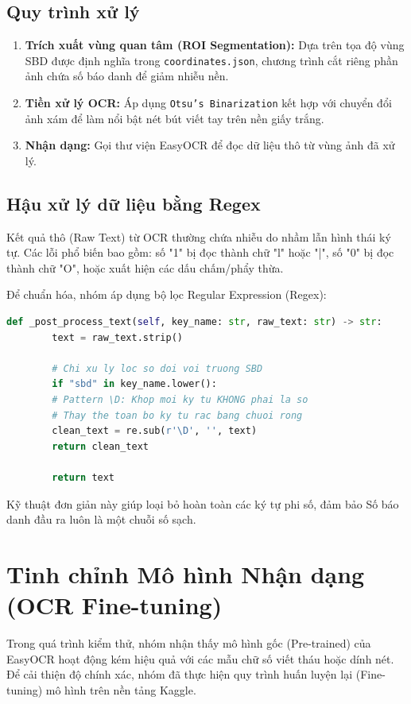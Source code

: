 \documentclass[6pt, a4paper]{report}
\begin{document}
	\subsection{Quy trình xử lý}
	\begin{enumerate}
		\item \textbf{Trích xuất vùng quan tâm (ROI Segmentation):} Dựa trên tọa độ vùng SBD được định nghĩa trong \texttt{coordinates.json}, chương trình cắt riêng phần ảnh chứa số báo danh để giảm nhiễu nền.
		\item \textbf{Tiền xử lý OCR:} Áp dụng \texttt{Otsu's Binarization} kết hợp với chuyển đổi ảnh xám để làm nổi bật nét bút viết tay trên nền giấy trắng.
		\item \textbf{Nhận dạng:} Gọi thư viện EasyOCR để đọc dữ liệu thô từ vùng ảnh đã xử lý.
	\end{enumerate}
	
	\subsection{Hậu xử lý dữ liệu bằng Regex}
	Kết quả thô (Raw Text) từ OCR thường chứa nhiễu do nhầm lẫn hình thái ký tự. Các lỗi phổ biến bao gồm: số "1" bị đọc thành chữ "l" hoặc "|", số "0" bị đọc thành chữ "O", hoặc xuất hiện các dấu chấm/phẩy thừa.
	
	Để chuẩn hóa, nhóm áp dụng bộ lọc Regular Expression (Regex):
	
	\begin{lstlisting}[language=Python, caption={Hàm lọc nhiễu SBD bằng Regex}]
		def _post_process_text(self, key_name: str, raw_text: str) -> str:
		text = raw_text.strip()
		
		# Chi xu ly loc so doi voi truong SBD
		if "sbd" in key_name.lower():
		# Pattern \D: Khop moi ky tu KHONG phai la so
		# Thay the toan bo ky tu rac bang chuoi rong
		clean_text = re.sub(r'\D', '', text)
		return clean_text
		
		return text
	\end{lstlisting}
	
	Kỹ thuật đơn giản này giúp loại bỏ hoàn toàn các ký tự phi số, đảm bảo Số báo danh đầu ra luôn là một chuỗi số sạch.
	
	\section{Tinh chỉnh Mô hình Nhận dạng (OCR Fine-tuning)}
	
	Trong quá trình kiểm thử, nhóm nhận thấy mô hình gốc (Pre-trained) của EasyOCR hoạt động kém hiệu quả với các mẫu chữ số viết tháu hoặc dính nét. Để cải thiện độ chính xác, nhóm đã thực hiện quy trình huấn luyện lại (Fine-tuning) mô hình trên nền tảng Kaggle.
	
\end{document}
